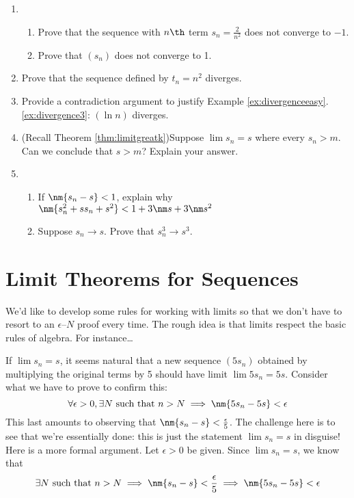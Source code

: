 \begin{exercisessec}{}{}
\begin{enumerate}
 	
  \item\begin{enumerate}
   	\item Prove that the sequence with $n\th$ term $s_n=\frac 2{n^2}$ does not converge to $-1$.
		\item Prove that $(s_n)$ does not converge to 1.
	\end{enumerate}
    
  \item Prove that the sequence defined by $t_n=n^2$ diverges.
  
 	
 	\item Provide a contradiction argument to justify Example \ref*{ex:divergenceeasy}.\ref{ex:divergence3}: $(\ln n)$ diverges.

		
	\item (Recall Theorem \ref{thm:limitgreatk})\quad Suppose $\lim s_n=s$ where every $s_n>m$. Can we conclude that $s>m$? Explain your answer.
	
	
	\item\begin{enumerate}
		\item If $\nm{s_n-s}<1$, explain why $\nm{s_n^2+ss_n+s^2}< 1+3\nm s+3\nm s^2$
		\item Suppose $s_n\to s$. Prove that $s_n^3\to s^3$.  
	\end{enumerate}
	
\end{enumerate}
\end{exercisessec}

\clearpage




\section{Limit Theorems for Sequences}

We'd like to develop some rules for working with limits so that we don't have to resort to an $\epsilon$--$N$ proof every time. The rough idea is that limits respect the basic rules of algebra. For instance\ldots

\begin{example}{}{}
If $\lim s_n=s$, it seems natural that a new sequence $(5s_n)$ obtained by multiplying the original terms by 5 should have limit $\lim 5s_n=5s$. Consider what we have to prove to confirm this:
\[\forall\epsilon>0, \exists N\text{ such that }n>N\implies \nm{5s_n-5s}<\epsilon\]
This last amounts to observing that $\nm{s_n-s}<\frac\epsilon 5$. The challenge here is to see that we're essentially done: this is just the statement $\lim s_n=s$ in disguise! Here is a more formal argument.\smallbreak
Let $\epsilon>0$ be given. Since $\lim s_n=s$, we know that
\[\exists N\text{ such that }n>N\implies \nm{s_n-s}<\frac\epsilon 5\implies \nm{5s_n-5s}<\epsilon\]
\end{example}

